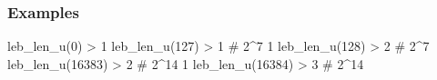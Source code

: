 \documentclass[letterpaper,10pt,english]{sphinxmanual}
\begin{document}
\begin{fulllineitems}
\begin{quote}
\begin{description}
\end{description}\end{quote}
\subsubsection*{Examples}

\sphinxAtStartPar
leb\_len\_u(0)     \sphinxhyphen{}\textgreater{} 1
leb\_len\_u(127)   \sphinxhyphen{}\textgreater{} 1   \# 2\textasciicircum{}7 \sphinxhyphen{} 1
leb\_len\_u(128)   \sphinxhyphen{}\textgreater{} 2   \# 2\textasciicircum{}7
leb\_len\_u(16383) \sphinxhyphen{}\textgreater{} 2   \# 2\textasciicircum{}14 \sphinxhyphen{} 1
leb\_len\_u(16384) \sphinxhyphen{}\textgreater{} 3   \# 2\textasciicircum{}14

\end{fulllineitems}

\end{document}
